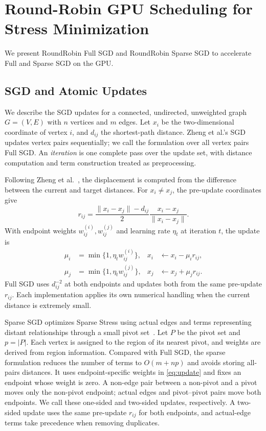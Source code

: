 \section{Round-Robin GPU Scheduling for Stress Minimization}
\label{sec:method}
We present RoundRobin Full SGD and RoundRobin Sparse SGD to accelerate Full and Sparse SGD on the GPU.

\subsection{SGD and Atomic Updates}
\label{sec:sgd-atomic}
We describe the SGD updates for a connected, undirected, unweighted graph $G=(V,E)$ with $n$ vertices and $m$ edges.
Let $x_i$ be the two-dimensional coordinate of vertex $i$, and $d_{ij}$ the shortest-path distance.
Zheng et al.'s SGD~\cite{ref28} updates vertex pairs sequentially; we call the formulation over all vertex pairs Full SGD.
An \emph{iteration} is one complete pass over the update set, with distance computation and term construction treated as preprocessing.

Following Zheng et al.~\cite{ref28}, the displacement is computed from the difference between the current and target distances.
For $x_i\ne x_j$, the pre-update coordinates give
\begin{equation}
r_{ij}=\frac{\lVert x_i-x_j\rVert-d_{ij}}{2}\frac{x_i-x_j}{\lVert x_i-x_j\rVert}.
\label{eq:displacement}
\end{equation}
With endpoint weights $w_{ij}^{(i)},w_{ij}^{(j)}$ and learning rate $\eta_t$ at iteration $t$, the update is
\begin{equation}
\begin{aligned}
\mu_i&=\min\{1,\eta_t w_{ij}^{(i)}\},& x_i&\leftarrow x_i-\mu_i r_{ij},\\
\mu_j&=\min\{1,\eta_t w_{ij}^{(j)}\},& x_j&\leftarrow x_j+\mu_j r_{ij}.
\end{aligned}
\label{eq:update}
\end{equation}
Full SGD uses $d_{ij}^{-2}$ at both endpoints and updates both from the same pre-update $r_{ij}$.
Each implementation applies its own numerical handling when the current distance is extremely small.

Sparse SGD optimizes Sparse Stress using actual edges and terms representing distant relationships through a small pivot set~\cite{ref20,ref28}.
Let $P$ be the pivot set and $p=|P|$.
Each vertex is assigned to the region of its nearest pivot, and weights are derived from region information.
Compared with Full SGD, the sparse formulation reduces the number of terms to $O(m+np)$ and avoids storing all-pairs distances.
It uses endpoint-specific weights in \eqref{eq:update} and fixes an endpoint whose weight is zero.
A non-edge pair between a non-pivot and a pivot moves only the non-pivot endpoint; actual edges and pivot--pivot pairs move both endpoints.
We call these one-sided and two-sided updates, respectively.
A two-sided update uses the same pre-update $r_{ij}$ for both endpoints, and actual-edge terms take precedence when removing duplicates.

